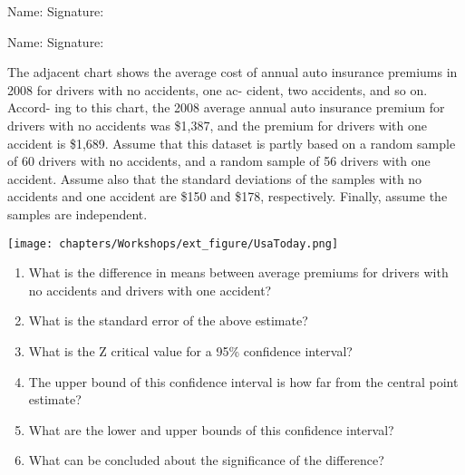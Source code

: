 \documentclass[11pt]{book}\usepackage[]{graphicx}\usepackage[]{color}
\begin{document}
\begin{exercises}
\begin{exercise}
\begin{center}
{{\vspace{4mm}
Name: \underline{\phantom{xxxxxxxxxxxxxxxxxxxxxxxx}} Signature: \underline{\phantom{xxxxxxxxxxxxxxxxxxxxxxxx}}

\vspace{4mm}
Name: \underline{\phantom{xxxxxxxxxxxxxxxxxxxxxxxx}} Signature: \underline{\phantom{xxxxxxxxxxxxxxxxxxxxxxxx}}
 }}
\end{center}

\begin{minipage}[ht]{6.9cm}

The adjacent chart shows the average cost of annual auto insurance premiums in 2008 for drivers with no accidents, one ac- cident, two accidents, and so on. Accord- ing to this chart, the 2008 average annual auto insurance premium for drivers with no accidents was \$1,387, and the premium for drivers with one accident is \$1,689. Assume that this dataset is partly based on a random sample of 60 drivers with no accidents, and a random sample of 56 drivers with one accident. Assume also that the standard deviations of the samples with no accidents and one accident are \$150 and \$178, respectively. Finally, assume the samples are independent.

\end{minipage} \hfill
\begin{minipage}[ht]{6.9cm}

\centering
  \texttt{[image: chapters/Workshops/ext\_figure/UsaToday.png]}
\end{minipage}

\begin{enumerate}
\item  What is the difference in means between average premiums for drivers with no accidents and drivers with one accident?
\item  What is the standard error of the above estimate?
\item  What is the Z critical value for a 95\% confidence interval?
\item  The upper bound of this confidence interval is how far from the central point estimate?
\item  What are the lower and upper bounds of this confidence interval?
\item  What can be concluded about the significance of the difference?
\end{enumerate}


\end{exercise}
\end{exercises}
\end{document}
